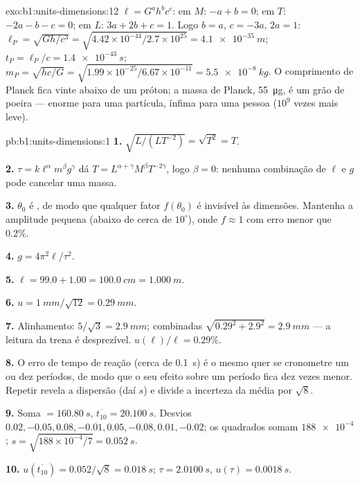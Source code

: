 \begin{solution}{exo:b1:units-dimensions:12}
$\ell = G^a h^b c^c$: em $M$: $-a + b = 0$; em $T$: $-2a - b - c = 0$; em $L$:
$3a + 2b + c = 1$. Logo $b = a$, $c = -3a$, $2a = 1$:
$\ell_P = \sqrt{Gh/c^3} = \sqrt{4.42\times10^{-44}/2.7\times10^{25}}
= \qty{4.1e-35}{m}$; $t_P = \ell_P/c = \qty{1.4e-43}{s}$;
$m_P = \sqrt{hc/G} = \sqrt{1.99\times10^{-25}/6.67\times10^{-11}}
= \qty{5.5e-8}{kg}$. O comprimento de Planck fica vinte 
abaixo de um próton; a massa de Planck, \qty{55}{\micro g}, é um grão de poeira
--- enorme para uma partícula, ínfima para uma pessoa ($10^9$ vezes mais leve).
\end{solution}

\begin{solution}{pb:b1:units-dimensions:1}
\textbf{1.} $\sqrt{L/(L T^{-2})} = \sqrt{T^2} = T$.

\textbf{2.} $\tau = k\ell^\alpha m^\beta g^\gamma$ dá
$T = L^{\alpha+\gamma} M^\beta T^{-2\gamma}$, logo $\beta = 0$: nenhuma
combinação de $\ell$ e $g$ pode cancelar uma massa.

\textbf{3.} $\theta_0$ é , de modo que qualquer fator
$f(\theta_0)$ é invisível às dimensões. Mantenha a amplitude pequena
(abaixo de cerca de $10^\circ$), onde $f \approx 1$ com erro menor que $0.2\%$.

\textbf{4.} $g = 4\pi^2\ell/\tau^2$.

\textbf{5.} $\ell = 99.0 + 1.00 = \qty{100.0}{cm} = \qty{1.000}{m}$.

\textbf{6.} $u = \qty{1}{mm}/\sqrt{12} = \qty{0.29}{mm}$.

\textbf{7.} Alinhamento: $5/\sqrt3 = \qty{2.9}{mm}$; combinadas
$\sqrt{0.29^2 + 2.9^2} = \qty{2.9}{mm}$ --- a leitura da trena é
desprezível. $u(\ell)/\ell = 0.29\%$.

\textbf{8.} O erro de tempo de reação (cerca de \qty{0.1}{s}) é o mesmo
quer se cronometre um ou dez períodos, de modo que o seu efeito sobre um
período fica dez vezes menor. Repetir revela a dispersão (daí $s$) e
divide a incerteza da média por $\sqrt8$.

\textbf{9.} Soma $= \qty{160.80}{s}$, $\overline{t_{10}} = \qty{20.100}{s}$.
Desvios $0.02, -0.05, 0.08, -0.01, 0.05, -0.08, 0.01, -0.02$; os quadrados
somam $\num{188e-4}$; $s = \sqrt{188\times10^{-4}/7} = \qty{0.052}{s}$.

\textbf{10.} $u(\overline{t_{10}}) = 0.052/\sqrt8 = \qty{0.018}{s}$;
$\tau = \qty{2.0100}{s}$, $u(\tau) = \qty{0.0018}{s}$.


\end{solution}
